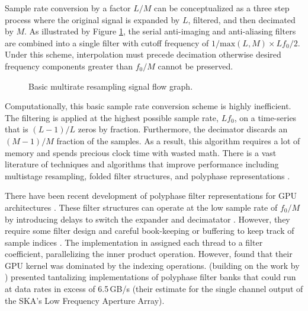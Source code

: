 \documentclass[11pt,preprint]{aastex}
\newcommand{\z}{\mathpzc{z}}
\begin{document}
Sample rate conversion by a factor $L/M$ can be conceptualized as a three step process where the original signal 
is expanded by $L$, filtered, and then decimated by $M$.  As illustrated by Figure \ref{fig:resample_basic}, 
the serial anti-imaging and 
anti-aliasing filters are combined into a single filter with cutoff frequency of 
$1/\mathrm{max}(L,M) \times Lf_0/2$.  Under this scheme, interpolation must precede decimation otherwise desired 
frequency components greater than $f_0/M$ cannot be preserved.

\begin{figure}[t]
\centering
\label{fig:resample_basic}
\caption{Basic multirate resampling signal flow graph.}
\end{figure}

Computationally, this basic sample rate conversion scheme is highly inefficient.  The filtering is applied at 
the highest possible sample rate, $Lf_0$, on a time-series that is $(L-1)/L$ zeros by fraction. Furthermore, the 
decimator discards an $(M-1)/M$ fraction of the samples.  As a result, this algorithm requires a lot of memory 
and spends precious clock time with wasted math.  There is a vast literature of techniques and algorithms that 
improve performance including multistage resampling, folded filter structures, and polyphase representations 
\citep{oppenheim10,lyons11,vaidyanathan93}.

There have been recent development of polyphase filter representations for GPU architectures 
\citep[i.e.][]{vanderveldt12,adamek14,kim14a}.  These filter structures can operate at the low sample rate of 
$f_0/M$
by introducing delays to switch the expander and decimatator \citep{crochiere81}.  However, they require 
some filter design and careful book-keeping or buffering to keep track of sample indices \citep{wang01}.
The implementation in \citet{kim14a} assigned each thread to a filter coefficient, parallelizing the 
inner product operation.  However, \citet{kim14a} found that their GPU kernel was dominated by the 
indexing operations.  \citet{adamek14} (building on the work by \citet{vanderveldt12}) presented tantalizing 
implementations of 
polyphase filter banks that could run at data rates in excess of 6.5\,GB/s (their estimate for the single channel 
output of the SKA's Low Frequency Aperture Array).
\end{document}

